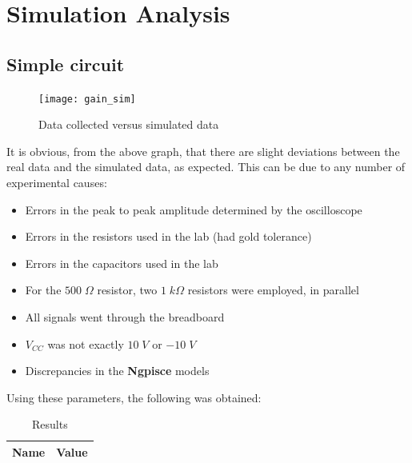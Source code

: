 \newpage

\section{Simulation Analysis}
\label{sec:simulation}

\subsection{Simple circuit}

\begin{figure}[H]
\centering
\texttt{[image: gain\_sim]}
\caption{Data collected versus simulated data}
\label{data_graph_sim}
\end{figure}

It is obvious, from the above graph, that there are slight deviations between the real data and the simulated data, as expected. This can be due to any number of experimental causes:

\begin{itemize}

\item Errors in the peak to peak amplitude determined by the oscilloscope

\item Errors in the resistors used in the lab (had gold tolerance)

\item Errors in the capacitors used in the lab

\item For the $500\;\Omega$ resistor, two $1\;k\Omega$ resistors were employed, in parallel

\item All signals went through the breadboard

\item $V_{CC}$ was not exactly $10\;V$ or $-10\;V$

\item Discrepancies in the {\bf Ngpisce} models

\end{itemize}

Using these parameters, the following was obtained:

\begin{table}[H]
  \centering
  \begin{tabular}{|c|c|}
    \hline
        {\bf Name} & {\bf Value} \\
        \hline
        \hline
        
        \hline
  \end{tabular}
  \caption{Results}
  \label{sim_results}
\end{table}

